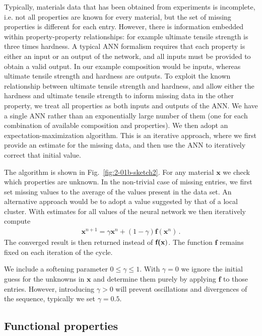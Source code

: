 \documentclass[review]{elsarticle}
\newcommand{\figref}[1]{Fig.~\ref{#1}}
\newcommand{\punc}[1]{\,#1}
\newcommand{\change}[1]{#1}
\newcommand{\vx}{\textbf{x}}
\newcommand{\vf}{\textbf{f}}
\begin{document}
Typically, materials data that has been obtained from experiments is
incomplete, i.e. not all properties are known for every material, but the
set of missing properties is different for each entry. \change{However,
there is information embedded within property-property relationships: for
example ultimate tensile strength is three times hardness.} A typical ANN
formalism requires that each property is either an input or an output of the
network, and all inputs must be provided to obtain a valid
output. \change{In our example composition would be inputs, whereas ultimate
tensile strength and hardness are outputs. To exploit the known
relationship between ultimate tensile strength and hardness, and allow
either the hardness and ultimate tensile strength to inform missing data
in the other property}, we treat all properties as both inputs and outputs
of the ANN. \change{We have a single ANN rather than an exponentially large
number of them (one for each combination of available composition and
properties).}  We then adopt an expectation-maximization
algorithm\cite{Krishnan08}. This is an iterative approach, where we first
provide an estimate for the missing data, and then use the ANN to
iteratively correct that initial value.

The algorithm is shown in \figref{fig:2-01b-sketch2}. For any material $\vx$
we check which properties are unknown. In the non-trivial case of missing
entries, we first set missing values to the average of the values present in
the data set. An alternative approach would be to adopt a value suggested by
that of a local cluster. With estimates for all values of the neural network
we then iteratively compute
%
\begin{align}
 \vx^{n+1}=\gamma\vx^n+(1-\gamma)\vf(\vx^n)\punc{.}
\end{align}
%
The converged result is then returned instead of $\vf\textbf(\vx)$. The function $\vf$
remains fixed on each iteration of the cycle.

We include a softening parameter $0\le\gamma\le1$. With $\gamma=0$ we ignore
the initial guess for the unknowns in $\vx$ and determine them purely by
applying $\vf$ to those entries. However, introducing $\gamma>0$ will
prevent oscillations and divergences of the sequence, typically we set
$\gamma=0.5$.

\subsection{Functional properties} \label{sec:frameworkgraph}
\end{document}
